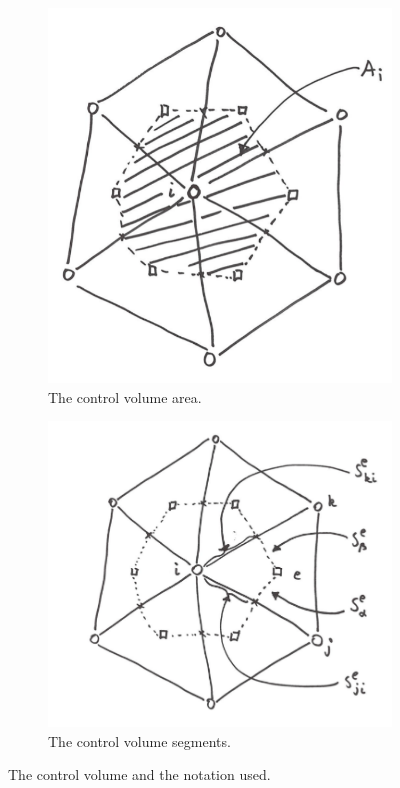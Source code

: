 \documentclass[acmtog]{acmart}
\begin{document}
\begin{figure}[htbp]
  \centering
  \begin{subfigure}[b]{0.235\textwidth}
       \centering
       \includegraphics[width=\textwidth]{images/cv1.png}
       \caption{The control volume area.}
       \label{fig:cv1}
   \end{subfigure}
   \hfill
   \begin{subfigure}[b]{0.235\textwidth}
       \centering
       \includegraphics[width=\textwidth]{images/cv2.png}
       \caption{The control volume segments.}
       \label{fig:cv2}
   \end{subfigure}
  \caption{The control volume and the notation used.}
  \label{fig:cv}
\end{figure}
\end{document}
